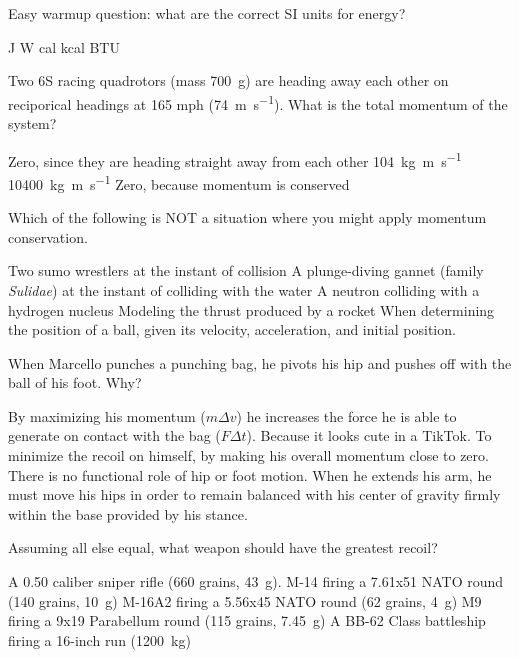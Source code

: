 \documentclass[exam,addpoints, noanswers]{exam}
\begin{document}
\begin{questions}
\question[5] Easy warmup question: what are the correct SI units for energy? 
\begin{choices}
\CorrectChoice \si{\joule}
\choice \si{\watt}
\choice cal
\choice kcal
\choice BTU
\end{choices}

\question[5] Two 6S racing quadrotors (mass \SI{700}{\gram}) are heading away each other on reciporical headings at 165 mph (\SI{74}{\meter\per\second}). What is the total momentum of the system? 
\begin{choices}
\CorrectChoice Zero, since they are heading straight away from each other
\choice \SI{104}{\kilo\gram\meter\per\second}
\choice \SI{10400}{\kilo\gram\meter\per\second}
\choice Zero, because momentum is conserved
\end{choices}

\question[5] Which of the following is NOT a situation where you might apply momentum conservation. 
\begin{choices}
\choice Two sumo wrestlers at the instant of collision
\choice A plunge-diving gannet (family \emph{Sulidae}) at the instant of colliding with the water
\choice A neutron colliding with a hydrogen nucleus
\choice Modeling the thrust produced by a rocket
\CorrectChoice When determining the position of a ball, given its velocity, acceleration, and initial position. 
\end{choices}

\question[5] When Marcello punches a punching bag, he pivots his hip and pushes off with the ball of his foot. Why?
\begin{choices}
\CorrectChoice By maximizing his momentum ($m\Delta v$) he increases the force he is able to generate on contact with the bag ($F\Delta t$). 
\choice Because it looks cute in a TikTok. 
\choice To minimize the recoil on himself, by making his overall momentum close to zero. 
\choice There is no functional role of hip or foot motion. 
\choice When he extends his arm, he must move his hips in order to remain balanced with his center of gravity firmly within the base provided by his stance. 
\end{choices}

\clearpage
\question[5] Assuming all else equal, what weapon should have the greatest recoil?  
\begin{choices}
\choice A 0.50 caliber sniper rifle (660 grains, \SI{43}{\gram}). 
\choice M-14 firing a 7.61x51 NATO round (140 grains, \SI{10}{\gram})
\choice M-16A2 firing a 5.56x45 NATO round (62 grains, \SI{4}{\gram})
\choice M9 firing a 9x19 Parabellum round (115 grains, \SI{7.45}{\gram})
\CorrectChoice A BB-62 Class battleship firing a 16-inch run (\SI{1200}{\kilo\gram})
\end{choices}


\end{questions}
\end{document}
